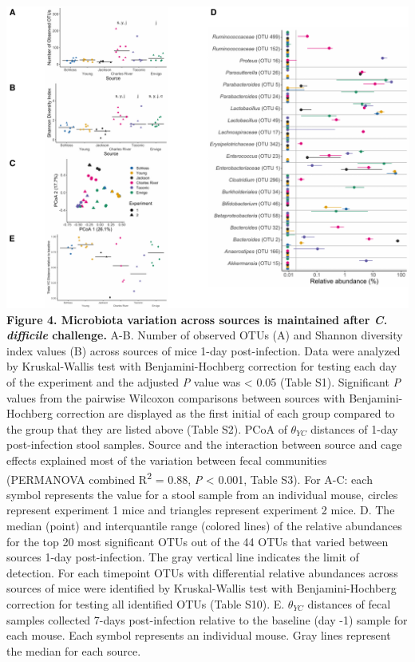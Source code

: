 \documentclass[
  11pt,
]{article}
\begin{document}
\newpage

\includegraphics{figure_4.pdf} \textbf{Figure 4. Microbiota variation
across sources is maintained after \emph{C. difficile} challenge.} A-B.
Number of observed OTUs (A) and Shannon diversity index values (B)
across sources of mice 1-day post-infection. Data were analyzed by
Kruskal-Wallis test with Benjamini-Hochberg correction for testing each
day of the experiment and the adjusted \emph{P} value was \textless{}
0.05 (Table S1). Significant \emph{P} values from the pairwise Wilcoxon
comparisons between sources with Benjamini-Hochberg correction are
displayed as the first initial of each group compared to the group that
they are listed above (Table S2). PCoA of \(\theta_{YC}\) distances of
1-day post-infection stool samples. Source and the interaction between
source and cage effects explained most of the variation between fecal
communities (PERMANOVA combined R\textsuperscript{2} = 0.88, \emph{P}
\textless{} 0.001, Table S3). For A-C: each symbol represents the value
for a stool sample from an individual mouse, circles represent
experiment 1 mice and triangles represent experiment 2 mice. D. The
median (point) and interquantile range (colored lines) of the relative
abundances for the top 20 most significant OTUs out of the 44 OTUs that
varied between sources 1-day post-infection. The gray vertical line
indicates the limit of detection. For each timepoint OTUs with
differential relative abundances across sources of mice were identified
by Kruskal-Wallis test with Benjamini-Hochberg correction for testing
all identified OTUs (Table S10). E. \(\theta_{YC}\) distances of fecal
samples collected 7-days post-infection relative to the baseline (day
-1) sample for each mouse. Each symbol represents an individual mouse.
Gray lines represent the median for each source.
\end{document}
